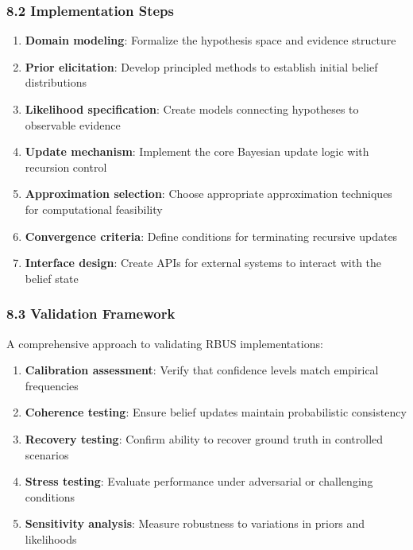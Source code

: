 \documentclass[
]{article}
\providecommand{\tightlist}{%
  \setlength{\itemsep}{0pt}\setlength{\parskip}{0pt}}
\begin{document}
\subsubsection{8.2 Implementation Steps}\label{implementation-steps-1}

\begin{enumerate}
\def\labelenumi{\arabic{enumi}.}
\tightlist
\item
  \textbf{Domain modeling}: Formalize the hypothesis space and evidence
  structure
\item
  \textbf{Prior elicitation}: Develop principled methods to establish
  initial belief distributions
\item
  \textbf{Likelihood specification}: Create models connecting hypotheses
  to observable evidence
\item
  \textbf{Update mechanism}: Implement the core Bayesian update logic
  with recursion control
\item
  \textbf{Approximation selection}: Choose appropriate approximation
  techniques for computational feasibility
\item
  \textbf{Convergence criteria}: Define conditions for terminating
  recursive updates
\item
  \textbf{Interface design}: Create APIs for external systems to
  interact with the belief state
\end{enumerate}

\subsubsection{8.3 Validation Framework}\label{validation-framework-1}

A comprehensive approach to validating RBUS implementations:

\begin{enumerate}
\def\labelenumi{\arabic{enumi}.}
\tightlist
\item
  \textbf{Calibration assessment}: Verify that confidence levels match
  empirical frequencies
\item
  \textbf{Coherence testing}: Ensure belief updates maintain
  probabilistic consistency
\item
  \textbf{Recovery testing}: Confirm ability to recover ground truth in
  controlled scenarios
\item
  \textbf{Stress testing}: Evaluate performance under adversarial or
  challenging conditions
\item
  \textbf{Sensitivity analysis}: Measure robustness to variations in
  priors and likelihoods
\end{enumerate}
\end{document}
